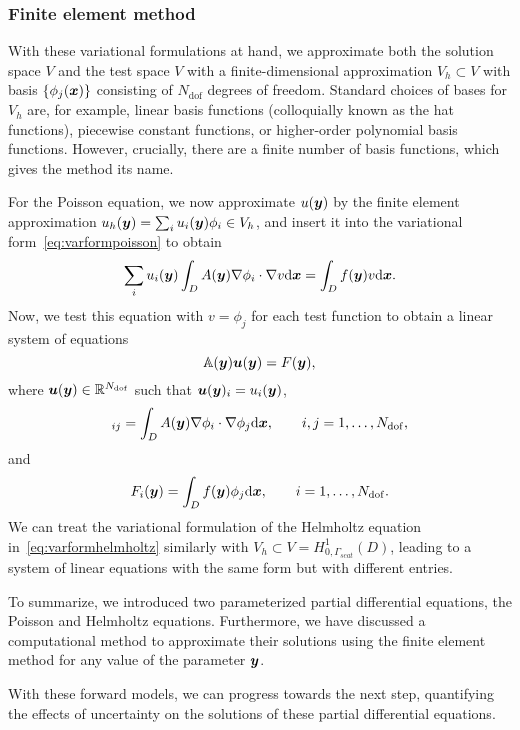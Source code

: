 \subsubsection{Finite element method}
With these variational formulations at hand, we approximate both the solution space $V$ and the test space $V$ with a finite-dimensional approximation $V_h\subset V$ with basis $\left\{ \phi_j({{\bm{x}}}) \right\}$ consisting of $N_{\mathrm{dof}}$ degrees of freedom.
Standard choices of bases for $V_h$ are, for example, linear basis functions (colloquially known as the hat functions), piecewise constant functions, or higher-order polynomial basis functions.
However, crucially, there are a finite number of basis functions, which gives the method its name.

For the Poisson equation, we now approximate $u({\bm{y}})$ by the finite element approximation $u_h({\bm{y}})=\sum_{i}u_i({\bm{y}})\phi_i\in V_h$, and insert it into the variational form~\eqref{eq:varformpoisson} to obtain
\begin{equation*}
    \sum_{i} u_i({\bm{y}}) \int_D A({\bm{y}}) \nabla \phi_i  \cdot \nabla v \mathrm{d}{{\bm{x}}} = \int_D f({\bm{y}})v \mathrm{d}{{\bm{x}}}.
\end{equation*}
Now, we test this equation with $v=\phi_j$ for each test function to obtain a linear system of equations
\begin{equation*}
    \mathbb{A}({\bm{y}})\bm{u}({\bm{y}})=F({\bm{y}}),
\end{equation*}
where ${\bm{u}}({\bm{y}})\in\mathbb{R}^{N_{\mathrm{dof}}}$ such that $\bm{u}({\bm{y}})_i = u_i({\bm{y}})$,
\begin{equation*}
[\mathbb{A}(\y)]_{ij}=\int_D A(\y) \nabla \phi_i  \cdot \nabla \phi_j \dx, \qquad i,j=1,\ldots, N_{\mathrm{dof}},
\end{equation*}
and
\begin{equation*}
    F_i({\bm{y}}) = \int_D f({\bm{y}}) \phi_j \mathrm{d}{{\bm{x}}}, \qquad i=1,\ldots, N_{\mathrm{dof}}.
\end{equation*}
We can treat the variational formulation of the Helmholtz equation in~\eqref{eq:varformhelmholtz} similarly with $V_h\subset V=H^1_{0, \Gamma_{scat}}(D)$, leading to a system of linear equations with the same form but with different entries.

To summarize, we introduced two parameterized partial differential equations, the Poisson and Helmholtz equations.
Furthermore, we have discussed a computational method to approximate their solutions using the finite element method for any value of the parameter ${\bm{y}}$.

With these forward models, we can progress towards the next step, quantifying the effects of uncertainty on the solutions of these partial differential equations.